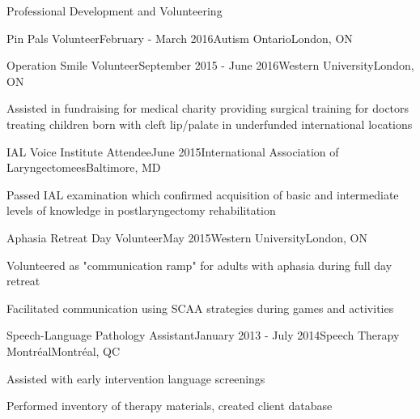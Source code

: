 \documentclass{resume} %
\begin{document}
\begin{rSection}{Professional Development and Volunteering}
\begin{rSubsection}{Pin Pals Volunteer}{February - March 2016}{Autism Ontario}{London, ON}
	\end{rSubsection}
	
	
	\begin{rSubsection}{Operation Smile Volunteer}{September 2015 - June 2016}{Western University}{London, ON}
	\item Assisted in fundraising for medical charity providing surgical training for doctors treating children born with cleft lip/palate in underfunded international locations
	
	\end{rSubsection}
	
	
	\begin{rSubsection}{IAL Voice Institute Attendee}{June 2015}{International Association of Laryngectomees}{Baltimore, MD}
	\item Passed IAL examination which confirmed acquisition of basic and intermediate levels of knowledge in postlaryngectomy rehabilitation
	
	\end{rSubsection}
	

	
	\begin{rSubsection}{Aphasia Retreat Day Volunteer}{May 2015}{Western University}{London, ON}
	\item Volunteered as "communication ramp" for adults with aphasia during full day retreat
	\item Facilitated communication using SCAA strategies during games and activities 
	
	\end{rSubsection}
	
	
	
	\begin{rSubsection}{Speech-Language Pathology Assistant}{January 2013 - July 2014}{Speech Therapy Montr\'eal}{Montr\'eal, QC}
	\item Assisted with early intervention language screenings
	\item Performed inventory of therapy materials, created client database
	\end{rSubsection}
	

\end{rSection}
\end{document}
